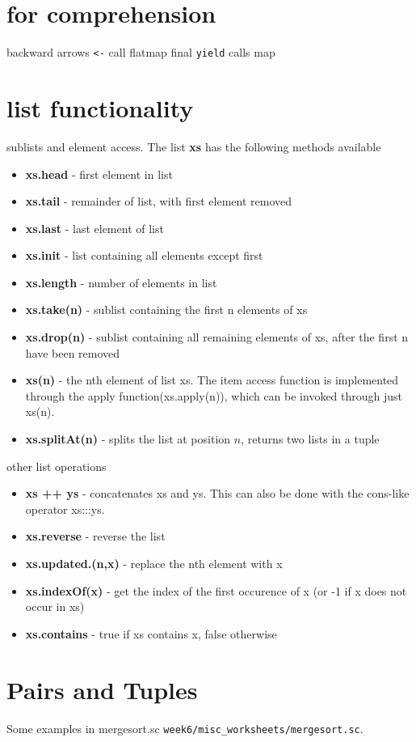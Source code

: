 \section{ for comprehension}
backward arrows \lstinline|<-| call flatmap
final \lstinline|yield| calls map

\section{list functionality}
sublists and element access. The list \textbf{xs} has the following methods available
\begin{itemize}
  \item \textbf{xs.head} - first element in list
  \item \textbf{xs.tail} - remainder of list, with first element removed
  \item \textbf{xs.last} - last element of list
  \item \textbf{xs.init} - list containing all elements except first
  \item \textbf{xs.length} - number of elements in list
  \item \textbf{xs.take(n)} - sublist containing the first n elements of xs
  \item \textbf{xs.drop(n)} - sublist containing all remaining elements of xs, after the first n have been removed
  \item \textbf{xs(n)} - the nth element of list xs. The item access function is implemented through the apply function(xs.apply(n)), which can be invoked through just xs(n). 
  \item \textbf{xs.splitAt(n)} - splits the list at position $n$, returns two lists in a tuple
\end{itemize}
other list operations
\begin{itemize}
  \item \textbf{xs ++ ys} - concatenates xs and ys. This can also be done with the cons-like operator xs:::ys.
  \item \textbf{xs.reverse} - reverse the list
  \item \textbf{xs.updated.(n,x)} - replace the nth element with x
  \item \textbf{xs.indexOf(x)} - get the index of the first occurence of x (or -1 if x does not occur in xs)
  \item \textbf{xs.contains} - true if xs contains x, false otherwise
\end{itemize}

\section{Pairs and Tuples}
Some examples in  mergesort.sc \verb|week6/misc_worksheets/mergesort.sc|.


